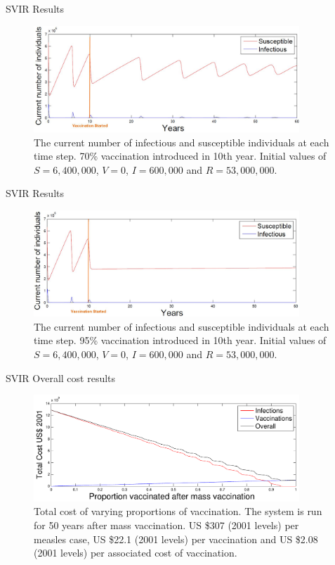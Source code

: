 \documentclass{beamer}
\begin{document}
\begin{frame} {SVIR} {Results}
\begin{figure}
\centering
\includegraphics[width=100mm]{figsvir70.jpg}
\caption{The current number of infectious and susceptible individuals at each time step. 70\% vaccination introduced in 10th year. Initial values of $S=6,400,000$, $V=0$, $I=600,000$ and $R=53,000,000$.}
\end{figure}
\end{frame}

\begin{frame} {SVIR} {Results}
\begin{figure}
\centering
\includegraphics[width=100mm]{figsvir95.jpg}
\caption{The current number of infectious and susceptible individuals at each time step. 95\% vaccination introduced in 10th year. Initial values of $S=6,400,000$, $V=0$, $I=600,000$ and $R=53,000,000$.}
\end{figure}
\end{frame}

\begin{frame} {SVIR} {Overall cost results}
\begin{figure}
\centering
\includegraphics[width=100mm]{figproportionSVIRcost0to100}
\caption{Total cost of varying proportions of vaccination. The system is run for 50 years after mass vaccination. US \$307 (2001 levels) per measles case, US \$22.1 (2001 levels) per vaccination and US \$2.08 (2001 levels) per associated cost of vaccination.}
\end{figure}
\end{frame}
\end{document}

